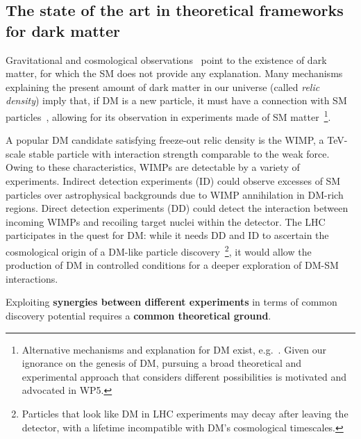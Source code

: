 \subsection{The state of the art in theoretical frameworks for dark matter}
\label{sub:stateOfTheArtTheory}
\smallskip

Gravitational and cosmological observations~\cite{Bertone:2016nfn} point to the existence of dark matter, for which the SM does not provide any explanation. 
Many mechanisms explaining the present amount of dark matter in our universe (called \textit{relic density}) imply that, if DM is a new particle, it must have a connection with SM particles~\cite{Hall:2009bx,Bernal:2017kxu,Steigman:2012nb}, allowing for its observation in experiments made of SM matter~\footnote{Alternative mechanisms and explanation for DM exist, e.g.~\cite{McGaugh_2016,Lennon:2017tqq,Bird:2016dcv,Marsh:2015xka}. Given our ignorance on the genesis of DM, pursuing a broad theoretical and experimental approach that considers different possibilities is motivated and advocated in WP5.}.  

A popular DM candidate satisfying freeze-out relic density is the WIMP, a TeV-scale stable particle with interaction strength comparable to the weak force.  
Owing to these characteristics, WIMPs are detectable by a variety of experiments. 
Indirect detection experiments (ID) could observe excesses of SM particles over astrophysical backgrounds due to WIMP annihilation in DM-rich regions. 
Direct detection experiments (DD) could detect the interaction between incoming WIMPs and recoiling target nuclei within the detector. 
The LHC participates in the quest for DM: while it needs DD and ID to ascertain the cosmological origin of a DM-like particle discovery~\footnote{Particles that look like DM in LHC experiments may decay after leaving the detector, with a lifetime incompatible with DM’s cosmological timescales.}, it would allow the production of DM in controlled conditions for a deeper exploration of DM-SM interactions. 

Exploiting \textbf{synergies between different experiments} in terms of common discovery potential requires a \textbf{common theoretical ground}. 

